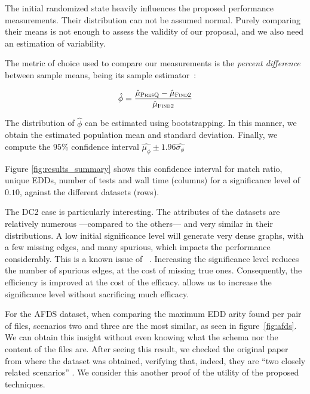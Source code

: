 The initial randomized state heavily influences the proposed performance measurements.
Their distribution can not be assumed normal.
Purely comparing their means is not enough to assess the validity of our proposal, and we also need an estimation of variability.

The metric of choice used to compare our measurements is the \emph{percent difference}
between sample means, being its sample estimator~\cite{campelo_sample_2019}:

\begin{equation}
    \label{eq:percent_difference}
    \hat{\phi} = \frac{\hat{\mu}_{\textsc{PresQ}} - \hat{\mu}_{\textsc{Find2}}}{\hat{\mu}_{\textsc{Find2}}}
\end{equation}

The distribution of
$\hat{\phi}$ can be estimated using bootstrapping.
In this manner, we obtain the estimated population mean and standard deviation. Finally,
we compute the $95\%$ confidence interval $\hat{\mu_\phi} \pm 1.96 \hat{\sigma_\phi}$

Figure \ref{fig:results_summary} shows this confidence interval for match ratio, unique \glspl{EDD},
number of tests and wall time (columns) for a significance level of $0.10$, against the
different datasets (rows).

The DC2 case is particularly interesting. The attributes of the datasets
are relatively numerous ---compared to the others--- and very similar in their distributions.
A low initial significance level will generate very dense graphs, with a few missing edges, and
many spurious, which impacts the performance considerably.
This is a known issue of \Find~\cite{koeller2006heuristic}.
Increasing the significance level reduces the number of spurious edges, at the cost of
missing true ones. Consequently, the efficiency is improved at the cost of the efficacy.
\PresQ allows us to increase the significance
level without sacrificing much efficacy.

For the AFDS dataset, when comparing the maximum \gls{EDD} arity found per pair of files,
scenarios two and three are the most similar, as seen in figure~\ref{fig:afds}.
We can obtain this insight without even knowing what the schema nor the content of the files are.
After seeing this result, we checked the original paper from
where the dataset was obtained, verifying that, indeed, they are
``two closely related scenarios'' \cite{Gheraibia2019}.
We consider this another proof of the utility of the proposed techniques.

